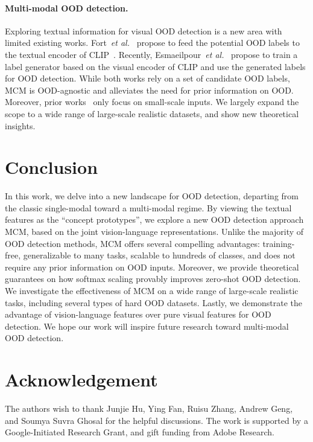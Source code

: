 \documentclass{article}
\begin{document}
\paragraph{Multi-modal OOD detection.} 
Exploring textual information for visual OOD detection is a new area with limited existing works. Fort~\emph{et al.}~\cite{fort2021exploring} propose to feed the potential OOD labels to the textual encoder of CLIP~\cite{radford2021learning}. Recently, Esmaeilpour~\emph{et al.}~\cite{esmaeilpour2022zero} propose to train a label generator based on the visual encoder of CLIP and use the generated labels for OOD detection. While both works rely on a set of candidate OOD labels, MCM is OOD-agnostic and alleviates the need for prior information on OOD. Moreover, prior works~\cite{esmaeilpour2022zero,radford2021learning} only focus on small-scale inputs. We largely expand the scope to a wide range of large-scale realistic datasets, and show new theoretical insights.

\section{Conclusion}
In this work, we delve into a new landscape for OOD detection, departing from the classic single-modal toward a multi-modal regime. By viewing the textual features as the ``concept prototypes'', we explore a new OOD detection approach MCM, based on the joint vision-language representations. Unlike the majority of OOD detection methods, MCM offers several compelling advantages: training-free, generalizable to many tasks, scalable to hundreds of classes, and does not require any prior information on OOD inputs. Moreover, we provide theoretical guarantees on how softmax scaling provably improves zero-shot OOD detection. We investigate the effectiveness of MCM on a wide range of large-scale realistic tasks, including several types of hard OOD datasets.  Lastly, we demonstrate the advantage of vision-language features over pure visual features for OOD detection. We hope our work will inspire future research toward multi-modal OOD detection.


\section*{Acknowledgement}
The authors wish to thank Junjie Hu, Ying Fan, Ruisu Zhang, Andrew Geng, and Soumya Suvra Ghosal for the helpful discussions.  The work is supported by a Google-Initiated Research Grant, and gift funding from Adobe Research. 
\end{document}
